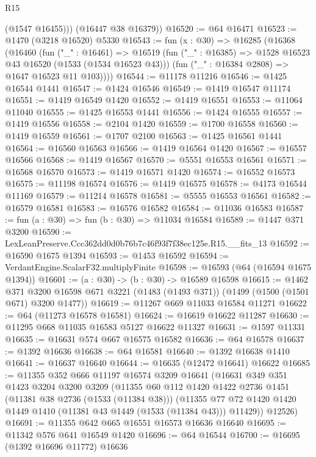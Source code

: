 \begin{lexlean}{R15}
\begin{coremodule}
          (@1547 @16455)))
      (@16447 @38 @16379))
@16520 := @64 @16471
@16523 := @1470 (@3218 @16520) @5330
@16543 := fun (x : @30) =>
  @16285
    (@16368
      (@16460
        (fun ("_" : @16461) =>
        @16519
          (fun ("_" : @16385) => @1528 @16523 @43 @16520 (@1533 (@1534 @16523 @43)))
          (fun ("_" : @16384 @2808) => @1647 @16523 @11 @103))))
@16544 := @11178 @11216
@16546 := @1425 @16544 @1441
@16547 := @1424 @16546
@16549 := @1419 @16547 @11174
@16551 := @1419 @16549 @1420
@16552 := @1419 @16551
@16553 := @11064 @11040
@16555 := @1425 @16553 @1441
@16556 := @1424 @16555
@16557 := @1419 @16556
@16558 := @2104 @1420
@16559 := @1700 @16558
@16560 := @1419 @16559
@16561 := @1707 @2100
@16563 := @1425 @16561 @1441
@16564 := @16560 @16563
@16566 := @1419 @16564 @1420
@16567 := @16557 @16566
@16568 := @1419 @16567
@16570 := @5551 @16553 @16561
@16571 := @16568 @16570
@16573 := @1419 @16571 @1420
@16574 := @16552 @16573
@16575 := @11198 @16574
@16576 := @1419 @16575
@16578 := @4173 @16544 @11169
@16579 := @11214 @16578
@16581 := @5555 @16553 @16561
@16582 := @16579 @16581
@16583 := @16576 @16582
@16584 := @11036 @16583
@16587 := fun (a : @30) => fun (b : @30) => @11034 @16584
@16589 := @1447 @371 @3200
@16590 := LexLeanPreserve.Ccc362dd0d0b76b7c46f93f7f38ec125e.R15.__fits_13
@16592 := @16590 @1675 @1394
@16593 := @1453 @16592
@16594 := VerdantEngine.ScalarF32.multiplyFinite
@16598 := @16593 (@64 (@16594 @1675 @1394))
@16601 := (a : @30) -> (b : @30) -> @16589 @16598
@16615 := @1462
    @371
    @3200
    @16598
    @671
    @3221
    (@1483 (@1493 @371))
    (@1499 (@1500 (@1501 @671) @3200 @1477))
@16619 := @11267 @669 @11033 @16584 @11271
@16622 := @64 (@11273 @16578 @16581)
@16624 := @16619 @16622 @11287
@16630 := @11295 @668 @11035 @16583 @5127 @16622 @11327
@16631 := @1597 @11331
@16635 := @16631 @574 @667 @16575 @16582
@16636 := @64 @16578
@16637 := @1392 @16636
@16638 := @64 @16581
@16640 := @1392 @16638 @1410
@16641 := @16637 @16640
@16644 := @16635 (@12472 @16641) @16622
@16685 := @11355
    @352
    @666
    @11197
    @16574
    @3209
    @16641
    (@16631
      @349
      @351
      @1423
      @3204
      @3200
      @3209
      (@11355
        @60
        @112
        @1420
        @1422
        @2736
        @1451
        (@11381 @38 @2736 (@1533 (@11384 @38)))
        (@11355 @77 @72 @1420 @1420 @1449 @1410 (@11381 @43 @1449 (@1533 (@11384 @43))) @11429))
      @12526)
@16691 := @11355 @642 @665 @16551 @16573 @16636 @16640
@16695 := @11342 @576 @641 @16549 @1420
@16696 := @64 @16544
@16700 := @16695 (@1392 @16696 @11772) @16636

\end{coremodule}
\end{lexlean}
